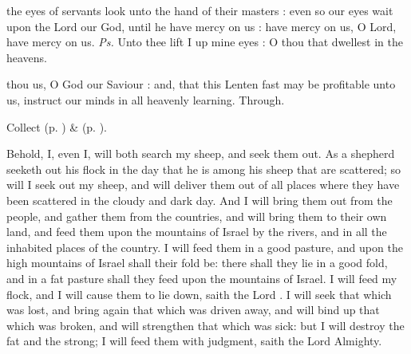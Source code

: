 \clearpage
{}

\introit
{} the eyes of servants look unto the hand of their masters : even so our eyes wait upon the Lord our God, until he have mercy on us : have mercy on us, O Lord, have mercy on us. \textit{Ps.} Unto thee lift I up mine eyes : O thou that dwellest in the heavens.

\collect
{} thou us, O God our Saviour : and, that this Lenten fast may be profitable unto us, instruct our minds in all heavenly learning. Through.


\begin{rubric}
     Collect  (p. \pageref{AshWednesdayMassCollect}) \&   (p. \pageref{SPLivingDeparted}).
\end{rubric}

 Behold, I, even I, will both search my sheep, and seek them out. As a shepherd seeketh out his flock in the day that he is among his sheep that are scattered; so will I seek out my sheep, and will deliver them out of all places where they have been scattered in the cloudy and dark day. And I will bring them out from the people, and gather them from the countries, and will bring them to their own land, and feed them upon the mountains of Israel by the rivers, and in all the inhabited places of the country. I will feed them in a good pasture, and upon the high mountains of Israel shall their fold be: there shall they lie in a good fold, and in a fat pasture shall they feed upon the mountains of Israel. I will feed my flock, and I will cause them to lie down, saith the Lord . I will seek that which was lost, and bring again that which was driven away, and will bind up that which was broken, and will strengthen that which was sick: but I will destroy the fat and the strong; I will feed them with judgment, saith the Lord Almighty.


